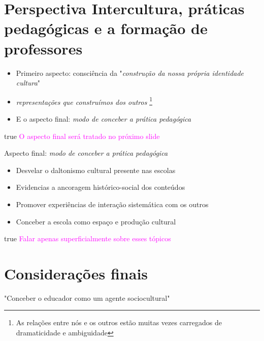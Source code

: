 \documentclass[]{beamer}
\newcommand{\obs}[1]{{
  \ifdefined\DRAFT
    \textcolor{magenta}{#1}
  \fi
}}
\def\DRAFT{true}
\begin{document}
  \section{Perspectiva Intercultura, práticas pedagógicas e a formação de
  professores}

  \begin{frame}{\secname *}
    \begin{itemize}
      \item
        Primeiro aspecto: consciência da "\emph{construção da nossa própria
        identidade cultura}"

      \item
        \emph{representações que construímos dos \emph{outros}}
        \footnote{
          As relações entre nós e os outros estão muitas vezes carregados de
          dramaticidade e ambiguidade
        }

      \item
        E o aspecto final: \emph{modo de conceber a prática pedagógica}
    \end{itemize}

    \obs{
      O aspecto final será tratado no próximo slide
    }
  \end{frame}

  \begin{frame}{Aspecto final: \emph{modo de conceber a prática pedagógica}}
    \begin{itemize}
      \item Desvelar o daltonismo cultural presente nas escolas
      \item Evidencias a ancoragem histórico-social dos conteúdos
      \item Promover experiências de interação sistemática com os outros
      \item Conceber a escola como espaço e produção cultural
    \end{itemize}

    \obs{
      Falar apenas superficialmente sobre esses tópicos
    }
  \end{frame}

  \section{Considerações finais}

  \begin{frame}{\secname *}
    \Huge "Conceber o educador como um agente sociocultural"
  \end{frame}

  
  
\end{document}
